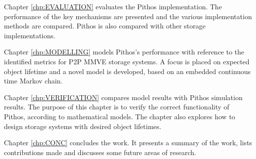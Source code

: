 Chapter \ref{chp:EVALUATION} evaluates the Pithos implementation. The performance of the key mechanisms are presented and the various implementation methods are compared. Pithos is also compared with other storage implementations.

Chapter \ref{chp:MODELLING} models Pithos's performance with reference to the identified metrics for P2P MMVE storage systems. A focus is placed on expected object lifetime and a novel model is developed, based on an embedded continuous time Markov chain.

Chapter \ref{chp:VERIFICATION} compares model results with Pithos simulation results. The purpose of this chapter is to verify the correct functionality of Pithos, according to mathematical models. The chapter also explores how to design storage systems with desired object lifetimes.

Chapter \ref{chp:CONC} concludes the work. It presents a summary of the work, lists contributions made and discusses some future areas of research.
